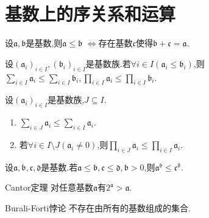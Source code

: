 \section{基数上的序关系和运算}

\begin{proposition}{}{}
	设$\mathfrak{a},\mathfrak{b}$是基数,则$\mathfrak{a}\leq\mathfrak{b}$ $\iff$存在基数$\mathfrak{c}$使得$\mathfrak{b}+\mathfrak{c}=\mathfrak{a}$.
\end{proposition}

\begin{proposition}{}{}
	设$\left(\mathfrak{a}_{i}\right)_{i\in I},\left(\mathfrak{b}_{i}\right)_{i\in I}$是基数族.若$\forall i\in I\left(\mathfrak{a}_{i}\leq\mathfrak{b}_{i}\right)$,则$\sum\limits_{i\in I}\mathfrak{a}_{i}\leq\sum\limits_{i\in I}\mathfrak{b}_{i},\prod\limits_{i\in I}\mathfrak{a}_{i}\leq\prod\limits_{i\in I}\mathfrak{b}_{i}$.
\end{proposition}

\begin{corollary}{}{}
	设$\left(\mathfrak{a}_{i}\right)_{i\in I}$是基数族,$J\subseteq I$.
	\begin{enumerate}
		\item $\sum\limits_{i\in J}\mathfrak{a}_{i}\leq\sum\limits_{i\in I}\mathfrak{a}_{i}$.
		\item 若$\forall i\in I\setminus J\left(\mathfrak{a}_{i}\neq 0\right)$,则$\prod\limits_{i\in J}\mathfrak{a}_{i}\leq\prod\limits_{i\in I}\mathfrak{a}_{i}$.
	\end{enumerate}
\end{corollary}

\begin{corollary}{}{}
	设$\mathfrak{a},\mathfrak{b},\mathfrak{c},\mathfrak{d}$是基数.若$\mathfrak{a}\leq\mathfrak{b},\mathfrak{c}\leq\mathfrak{d},\mathfrak{b}>0$,则$\mathfrak{a}^{\mathfrak{b}}\leq\mathfrak{c}^{\mathfrak{d}}$.
\end{corollary}

\begin{theorem}{Cantor定理}{}
	对任意基数$\mathfrak{a}$有$2^{\mathfrak{a}}>\mathfrak{a}$.
\end{theorem}

\begin{corollary}{Burali-Forti悖论}{}
	不存在由所有的基数组成的集合.
\end{corollary}


























